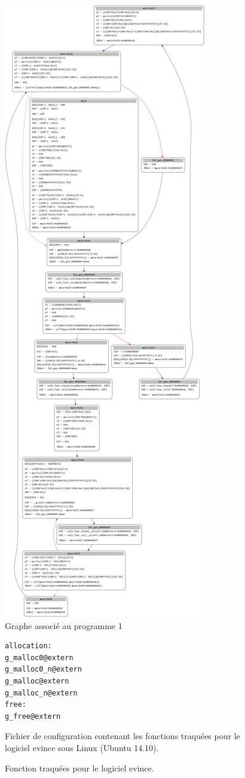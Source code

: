 \begin{figure}[h]
    \centering
    \includegraphics[scale=0.125]{simple-graph.png}
    \caption{Graphe associé au programme 1}
\end{figure}
\begin{figure}[h]
    \centering
    \begin {lstlisting}[frame=single]
allocation:
g_malloc0@extern
g_malloc0_n@extern
g_malloc@extern
g_malloc_n@extern
free:
g_free@extern
    \end{lstlisting}
    \caption{Fonction traquées pour le logiciel evince. }
    Fichier de configuration contenant les fonctions traquées pour le logiciel
evince sous Linux (Ubuntu 14.10).
\end{figure}

